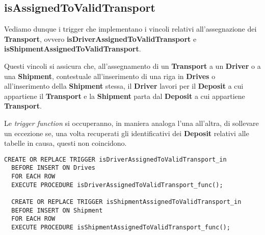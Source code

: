 \subsection{\textbf{isAssignedToValidTransport}}

Vediamo dunque i trigger che implementano i vincoli relativi all'assegnazione dei \textbf{Transport}, ovvero \textbf{isDriverAssignedToValidTransport} e \textbf{isShipmentAssignedToValidTransport}.

Questi vincoli si assicura che, all'assegnamento di un \textbf{Transport} a un \textbf{Driver} o a una \textbf{Shipment}, contestuale all'inserimento di una riga in \textbf{Drives} o all'inserimento della \textbf{Shipment} stessa,  il \textbf{Driver} lavori per il \textbf{Deposit} a cui appartiene il \textbf{Transport} e la \textbf{Shipment} parta dal \textbf{Deposit} a cui appartiene \textbf{Transport}.

Le \textit{trigger function} si occuperanno, in maniera analoga l'una all'altra, di sollevare un eccezione se, una volta recuperati gli identificativi dei \textbf{Deposit} relativi alle tabelle in causa, questi non coincidono.

\begin{lstlisting}[caption={Trigger per i vincoli \textbf{isAssignedToValidTransport}}]
  CREATE OR REPLACE TRIGGER isDriverAssignedToValidTransport_in
  BEFORE INSERT ON Drives
  FOR EACH ROW
  EXECUTE PROCEDURE isDriverAssignedToValidTransport_func();

  CREATE OR REPLACE TRIGGER isShipmentAssignedToValidTransport_in
  BEFORE INSERT ON Shipment
  FOR EACH ROW
  EXECUTE PROCEDURE isShipmentAssignedToValidTransport_func();
\end{lstlisting}

